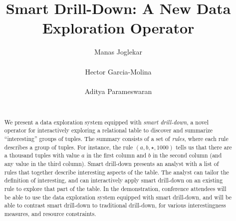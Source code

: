 \documentclass{vldb}
\newcommand{\techreporttext}[1]{}
\begin{document}
\title{Smart Drill-Down: A New Data Exploration Operator}
\author{
\alignauthor
Manas Joglekar\\
       \\
\alignauthor
Hector Garcia-Molina\\
       \\
\alignauthor 
Aditya Parameswaran\\
       \\
}
\maketitle

\begin{abstract}
We present a data exploration system equipped with {\em smart drill-down},
a novel operator for interactively exploring a relational table
to discover and summarize ``interesting'' groups of tuples.
The summary consists of a set of {\em rules}, where each rule describes a group of tuples.
For instance, the rule $(a, b, \star, 1000)$ tells us that
there are a thousand tuples with value $a$ in the first column and $b$
in the second column (and any value in the third column).
Smart drill-down presents an analyst with a list of rules that
together describe interesting aspects of the table.
The analyst can tailor the definition of interesting,
and can interactively apply smart drill-down on an existing rule to
explore that part of the table. In the demonstration, conference attendees will be able to use the data exploration system equipped with smart drill-down, and will be able to contrast smart drill-down to traditional drill-down,
for various interestingness measures, and resource constraints.
\end{abstract}









\balance

{\small

  
}


\techreporttext{}
\end{document}

